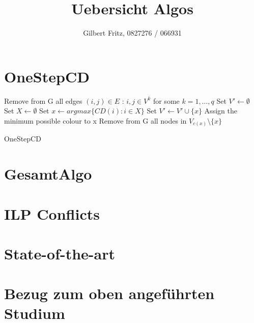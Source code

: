 \documentclass{article}
\title{Uebersicht Algos}
\author{Gilbert Fritz, 0827276 / 066931}
\begin{document}
\maketitle

\section{OneStepCD}

\begin{algorithm}
Remove from G all edges $(i,j) \in E$ : $i,j \in V^k$ for some $k=1,\ldots,q$\; 
Set $V' \gets \emptyset $\;
 {
  Set $X \gets \emptyset $\;
  Set $x \gets argmax\{CD(i) : i \in X \}$\;
  Set $V' \gets V' \cup \{x\}$\;
  Assign the minimum possible colour to x\;
  Remove from G all nodes in $V_{c(x)} \setminus \{x\} $
}
\caption{{\sc OneStepCD}}
\label{algo:max}
\end{algorithm}


\section{GesamtAlgo}



\section{ILP Conflicts}


\section{State-of-the-art}
 

\section{Bezug zum oben angef\"uhrten Studium}


			     			      
\end{document}
